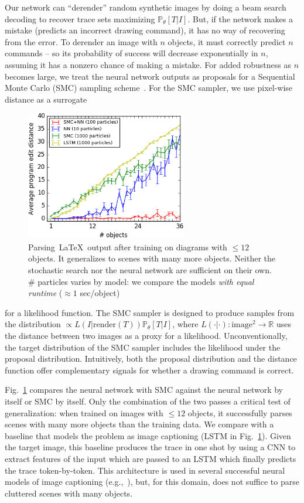 \documentclass{article}
\newcommand{\probability}{\mathds{P}} %
\theoremstyle{definition}
\begin{document}
Our network can ``derender'' random synthetic images
by doing a beam search decoding to
recover  trace sets maximizing $\probability_\theta
[T|I]$. But, if the network makes a mistake (predicts an incorrect
drawing command), it has no way of recovering from the error.  
To derender an image with $n$ objects, it must correctly predict $n$
commands -- so its probability of success will decrease
exponentially in $n$, assuming it has a nonzero chance of making a
mistake.  For added robustness as $n$ becomes large, we treat the
neural network outputs as proposals for a Sequential Monte Carlo (SMC) sampling scheme~\citep{SMCBook}.  For
the SMC sampler, we use pixel-wise distance as a surrogate
\clearpage\begin{figure}
  \centering
      \includegraphics[width = 7cm]{figures/editDistance36.png}
      \caption{Parsing~\LaTeX~output after training on diagrams with $\leq 12$ objects. It generalizes to scenes with many more objects. Neither the stochastic search nor the neural network are sufficient on their own. \# particles varies by model: we compare the models \emph{with equal runtime} ($\approx 1$ sec/object)}\label{syntheticResults}
\end{figure}
\noindent
for a
likelihood function. The SMC sampler is designed to produce samples
from the distribution $\propto L(I|\text{render}(T))
\probability_\theta[T|I]$, where $L(\cdot | \cdot):\text{image}^2\to
\mathbb{R}$ uses the distance between two images as a proxy for a
likelihood. Unconventionally, the target distribution of the SMC sampler
includes the likelihood under the proposal distribution.
Intuitively, both the proposal
distribution and the distance function offer complementary signals for
whether a drawing command is correct.

Fig.~\ref{syntheticResults}
compares the neural network with SMC against the neural network by
itself or SMC by itself.  Only the combination of the two passes a
critical test of generalization: when trained on images with $\leq 12$
objects, it successfully parses scenes with many more objects than the
training data.
We compare with a baseline that models the problem as image captioning (LSTM in Fig.~\ref{syntheticResults}).
Given the target image, this baseline produces the trace in one shot by
using a CNN to extract features of the input which are passed to an LSTM which finally predicts
the trace token-by-token.
This architecture is used in several successful neural models of image captioning (e.g.,~\cite{vinyals2015show}),
but, for this domain, does not suffice to parse cluttered scenes with many objects.
\end{document}
